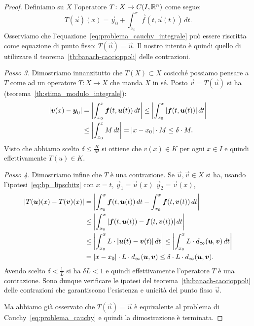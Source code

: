 \begin{proof}
  Definiamo su $X$ l'operatore $T\colon X \to C(I,{\mathbb R}^n)$ come segue:
  \[
    T(\vec u)(x) = \vec y_0 + \int_{x_0}^x \vec f(t,\vec u(t))\, dt.
  \]
  Osserviamo che l'equazione~\eqref{eq:problema_cauchy_integrale} può essere riscritta
  come equazione di punto fisso: $T(\vec u) = \vec u$. 
  Il nostro intento è quindi quello di utilizzare il teorema~\ref{th:banach-caccioppoli} delle contrazioni.

  \emph{Passo 3.}
  Dimostriamo innanzitutto che $T(X)\subset X$ cosicché possiamo pensare a $T$ come ad un operatore 
  $T\colon X\to X$ che manda $X$ in sé.
  Posto $\vec v = T(\vec u)$ si ha
  (teorema~\ref{th:stima_modulo_integrale}):
  \begin{align*}
    {\left|\boldsymbol v(x)-\boldsymbol y_0\right|} 
    &= {\left|\int_{x_0}^x \boldsymbol f(t, \boldsymbol u(t))\, dt\right|} 
    \le {\left|\int_{x_0}^x {\left|\boldsymbol f(t,\boldsymbol u(t))\right|}\, dt\right|}\\
    &\le {\left|\int_{x_0}^x M\, dt \right|} 
    = {\left|x-x_0\right|}\cdot M \le \delta \cdot M.
  \end{align*}
Visto che abbiamo scelto $\delta \le \frac{R}{M}$ si ottiene che $v(x) \in K$ per ogni $x\in I$ 
e quindi effettivamente $T(u)\in K$.

\emph{Passo 4.}
Dimostriamo infine che $T$ è una contrazione. 
Se $\vec u,\vec v\in X$ si ha, usando l'ipotesi~\eqref{eq:hp_lipschitz} con $x=t$, $\vec y_1=\vec u(x)$
$\vec y_2 = \vec v(x)$,
\begin{align*}
{\left|T(\boldsymbol u)(x)-T(\boldsymbol v)(x)\right|} 
  &= {\left|\int_{x_0}^x \boldsymbol f(t,\boldsymbol u(t))\, dt - \int_{x_0}^x \boldsymbol f(t,\boldsymbol v(t))\, dt\right|} \\
  &\le {\left|\int_{x_0}^x {\left|\boldsymbol f(t,\boldsymbol u(t))- \boldsymbol f(t,\boldsymbol v(t))\right|}\, dt \right|}\\
  &\le {\left|\int_{x_0}^x L\cdot  {\left|\boldsymbol u(t) - \boldsymbol v(t)\right|}\, dt\right|} 
  \le {\left|\int_{x_0}^x L \cdot d_\infty(\boldsymbol u, \boldsymbol v)\, dt\right|}  \\
  &={\left|x-x_0\right|}\cdot L \cdot d_\infty(\boldsymbol u,\boldsymbol v)
  \le \delta \cdot L \cdot d_\infty(\boldsymbol u,\boldsymbol v).
\end{align*}
Avendo scelto $\delta < \frac{1}{L}$ si ha $\delta L<1$ e quindi effettivamente l'operatore $T$ 
è una contrazione.
Sono dunque verificare le ipotesi del teorema~\ref{th:banach-caccioppoli} delle contrazioni
che garantiscono l'esistenza e unicità del punto fisso $\vec u$.

Ma abbiamo già osservato che $T(\vec u) = \vec u$ è equivalente al problema di Cauchy~\eqref{eq:problema_cauchy}
e quindi la dimostrazione è terminata.
\end{proof}

